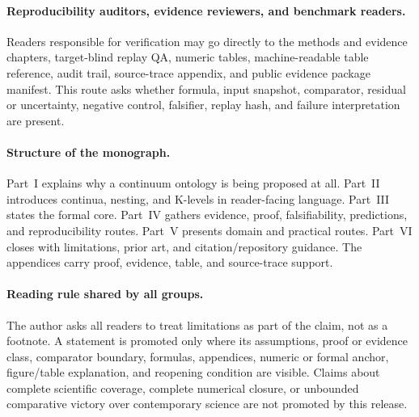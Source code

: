 \paragraph{Reproducibility auditors, evidence reviewers, and benchmark readers.}
Readers responsible for verification may go directly to the methods and
evidence chapters, target-blind replay QA, numeric tables, machine-readable
table reference, audit trail, source-trace appendix, and public evidence
package manifest. This route asks whether formula, input snapshot, comparator,
residual or uncertainty, negative control, falsifier, replay hash, and failure
interpretation are present.

\paragraph{Structure of the monograph.}
Part~I explains why a continuum ontology is being proposed at all. Part~II
introduces continua, nesting, and K-levels in reader-facing language. Part~III
states the formal core. Part~IV gathers evidence, proof, falsifiability,
predictions, and reproducibility routes. Part~V presents domain and practical
routes. Part~VI closes with limitations, prior art, and citation/repository
guidance. The appendices carry proof, evidence, table, and source-trace support.

\paragraph{Reading rule shared by all groups.}
The author asks all readers to treat limitations as part of the claim, not as a
footnote. A statement is promoted only where its assumptions, proof or evidence
class, comparator boundary, formulas, appendices, numeric or formal anchor,
figure/table explanation, and reopening condition are visible. Claims about
complete scientific coverage, complete numerical closure, or unbounded
comparative victory over contemporary science are not promoted by this release.

\clearpage
